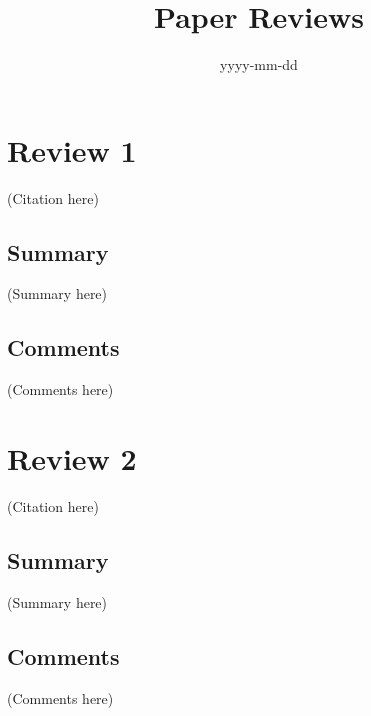 \documentclass{article}
\begin{document}
\title{Paper Reviews}
\date{yyyy-mm-dd}
\maketitle

\section*{Review 1}
(Citation here)

\subsection*{Summary}
(Summary here)

\subsection*{Comments}
(Comments here)

\section*{Review 2}
(Citation here) 

\subsection*{Summary}
(Summary here)

\subsection*{Comments}
(Comments here)
\end{document}
